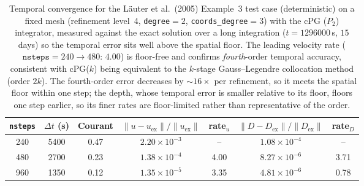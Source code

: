 \begin{table}[htbp]
  \centering
  \begin{tabular}{c c c c c c c}
    \toprule
    \texttt{nsteps} & $\Delta t$ (s) & Courant
      & $\|u-u_{\mathrm{ex}}\|/\|u_{\mathrm{ex}}\|$ & rate$_u$
      & $\|D-D_{\mathrm{ex}}\|/\|D_{\mathrm{ex}}\|$ & rate$_D$ \\
    \midrule
    240 & 5400 & 0.47 & $2.20\times10^{-3}$ & --   & $1.08\times10^{-4}$ & --   \\
    480 & 2700 & 0.23 & $1.38\times10^{-4}$ & 4.00 & $8.27\times10^{-6}$ & 3.71 \\
    960 & 1350 & 0.12 & $1.35\times10^{-5}$ & 3.35 & $4.81\times10^{-6}$ & 0.78 \\
    \bottomrule
  \end{tabular}
  \caption{Temporal convergence for the Läuter et al.\ (2005) Example~3 test case
    (deterministic) on a fixed mesh (refinement level~4, \texttt{degree}$=2$,
    \texttt{coords\_degree}$=3$) with the cPG ($P_2$) integrator, measured against the
    exact solution over a long integration ($t = 1296000$\,s, $15$ days) so the temporal
    error sits well above the spatial floor. The leading velocity rate
    ($\texttt{nsteps}=240\!\to\!480$: $4.00$) is floor-free and confirms \emph{fourth}-order
    temporal accuracy, consistent with cPG($k$) being equivalent to the $k$-stage
    Gauss--Legendre collocation method (order $2k$). The fourth-order error decreases by
    $\sim 16\times$ per refinement, so it meets the spatial floor within one step; the
    depth, whose temporal error is smaller relative to its floor, floors one step earlier,
    so its finer rates are floor-limited rather than representative of the order.}
  \label{tab:lauter-temporal-deg2}
\end{table}
